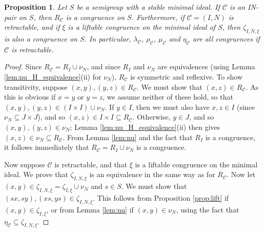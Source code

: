 \documentclass[11pt,a4paper]{article}
\newcommand{\C}{\mathscr C}
\renewcommand{\S}{\mathcal S}
\newcommand{\T}{\mathcal T}
\newcommand{\gJ}{\mathrel{\mathscr J}}
\newcommand{\De}{\Delta}
\newcommand{\rank}{\operatorname{rank}}
\newcommand{\id}{\operatorname{id}}
\newcommand{\set}[2]{\{ {#1} : {#2} \}}
\renewcommand{\emptyset}{\varnothing}
\newcommand{\1}{\id_n}
\newcommand{\sm}{\setminus}
\newcommand{\sub}{\subseteq}
\newcommand{\pf}{\begin{proof}}
\newcommand{\epf}{\end{proof}}
\numberwithin{equation}{section}
\newtheorem{prop}[equation]{Proposition}
\theoremstyle{definition}
\newtheorem{rem}[equation]{Remark}
\begin{document}

\begin{prop}
\label{prop-AreCongs}
Let $S$ be a semigroup with a stable minimal ideal.  If $\C$ is an IN-pair on $S$, then $R_\C$ is a congruence on $S$.  Furthermore, if $\C=(I,N)$ is retractable, and if $\xi$ is a liftable congruence on the minimal ideal of $S$, then $\zeta_{I,N,\xi}$ is also a congruence on $S$.  In particular, $\lambda_\C$, $\rho_\C$, $\mu_\C$ and $\eta_\C$ are all congruences if $\C$ is retractable.
\end{prop}

\pf
Since $R_\C=R_I\cup\nu_N$, and since $R_I$ and $\nu_N$ are equivalences (using Lemma \ref{lem:nu_H_equivalence}(ii) for $\nu_N$), $R_\C$ is symmetric and reflexive.  To show transitivity, suppose $(x,y),(y,z)\in R_\C$.  We must show that $(x,z)\in R_\C$.  As this is obvious if $x=y$ or $y=z$, we assume neither of these hold, so that $(x,y),(y,z)\in (I\times I)\cup\nu_N$.  If $y\in I$, then we must also have $x,z\in I$ (since $\nu_N\sub J\times J$), and so $(x,z)\in I\times I\sub R_\C$.  Otherwise, $y\in J$, and so $(x,y),(y,z)\in\nu_N$; Lemma \ref{lem:nu_H_equivalence}(ii) then gives $(x,z)\in\nu_N\sub R_\C$.  From Lemma \ref{lem:nu} and the fact that $R_I$ is a congruence, it follows immediately that $R_\C=R_I\cup\nu_N$ is a congruence.  

Now suppose $\C$ is retractable, and that $\xi$ is a liftable congruence on the minimal ideal.  We prove that $\zeta_{I,N,\xi}$ is an equivalence in the same way as for $R_\C$.
Now let $(x,y)\in\zeta_{I,N,\xi}=\zeta_{I,\xi}\cup\nu_N$ and $s\in S$.  We must show that $(sx,sy),(xs,ys)\in\zeta_{I,N,\xi}$.  This follows from Proposition \ref{prop:lift} if $(x,y)\in\zeta_{I,\xi}$, or from Lemma \ref{lem:nu} if $(x,y)\in\nu_N$, using the fact that~$\eta_\C\sub\zeta_{I,N,\xi}$.  \epf
\end{document}
